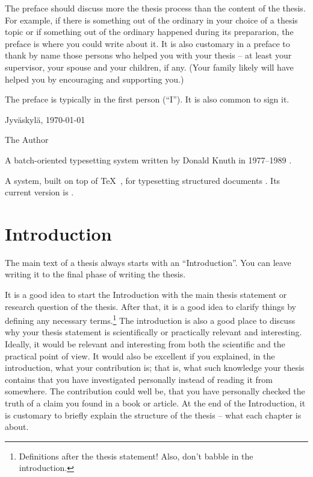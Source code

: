 \documentclass[utf8,english]{gradu3}
\begin{document}
The preface should discuss more the thesis process than the content of
the thesis.  For example, if there is something out of the ordinary in
your choice of a thesis topic or if something out of the ordinary
happened during its prepararion, the preface is where you could write
about it.  It is also customary in a preface to thank by name those
persons who helped you with your thesis -- at least your supervisor,
your spouse and your children, if any.  (Your family likely will have
helped you by encouraging and supporting you.)

The preface is typically in the first person (``I'').  It is also common
to sign it.

Jyväskylä, \today

\bigskip

The Author

\begin{thetermlist}
\item[\TeX] A batch-oriented typesetting system written by 
Donald Knuth in 1977--1989 \parencite[see][]{knuth86:_texbook}. 
\item[\LaTeX] A system, built on top of \TeX\
  \parencite{knuth86:_texbook}, for typesetting structured
  documents \parencite[see][]{lamport94:_latex}.  Its current version
  is \LaTeXe.
\end{thetermlist}

\mainmatter

\chapter{Introduction}

The main text of a thesis always starts with an ``Introduction''.
You can leave writing it to the final phase of writing the thesis.

It is a good idea to start the Introduction with the main thesis
statement or research question of the thesis.  After that, it is a
good idea to clarify things by defining any necessary
terms.\footnote{Definitions after the thesis statement!  Also, don't
  babble in the introduction.}  The introduction is also a good place
to discuss why your thesis statement is scientifically or practically
relevant and interesting.  Ideally, it would be relevant and
interesting from both the scientific and the practical point of view.
It would also be excellent if you explained, in the introduction, what
your contribution is; that is, what such knowledge your thesis
contains that you have investigated personally instead of reading it
from somewhere.  The contribution could well be, that you have
personally checked the truth of a claim you found in a book or
article.  At the end of the Introduction, it is customary to briefly
explain the structure of the thesis -- what each chapter is about.
\end{document}
